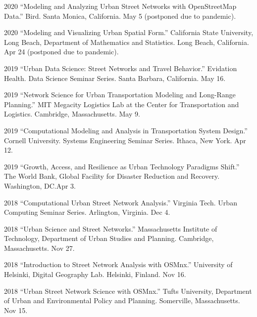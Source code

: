 \documentclass[12pt,letterpaper]{report}
\begin{document}
\begin{tablist}
        \item[2020] \tab{}\enquote{Modeling and Analyzing Urban Street Networks with OpenStreetMap Data.} Bird. Santa Monica, California. May 5 (postponed due to pandemic).

        \item[2020] \tab{}\enquote{Modeling and Visualizing Urban Spatial Form.} California State University, Long Beach, Department of Mathematics and Statistics. Long Beach, California. Apr 24 (postponed due to pandemic).

        \item[2019] \tab{}\enquote{Urban Data Science: Street Networks and Travel Behavior.} Evidation Health. Data Science Seminar Series. Santa Barbara, California. May 16.

        \item[2019] \tab{}\enquote{Network Science for Urban Transportation Modeling and Long-Range Planning.} MIT Megacity Logistics Lab at the Center for Transportation and Logistics. Cambridge, Massachusetts. May 9.

        \item[2019] \tab{}\enquote{Computational Modeling and Analysis in Transportation System Design.} Cornell University. Systems Engineering Seminar Series. Ithaca, New York. Apr 12.

        \item[2019] \tab{}\enquote{Growth, Access, and Resilience as Urban Technology Paradigms Shift.} The World Bank, Global Facility for Disaster Reduction and Recovery. Washington, DC.\@ Apr 3.

        \item[2018] \tab{}\enquote{Computational Urban Street Network Analysis.} Virginia Tech. Urban Computing Seminar Series. Arlington, Virginia. Dec 4.

        \item[2018] \tab{}\enquote{Urban Science and Street Networks.} Massachusetts Institute of Technology, Department of Urban Studies and Planning. Cambridge, Massachusetts. Nov 27.

        \item[2018] \tab{}\enquote{Introduction to Street Network Analysis with OSMnx.} University of Helsinki, Digital Geography Lab. Helsinki, Finland. Nov 16.

        \item[2018] \tab{}\enquote{Urban Street Network Science with OSMnx.} Tufts University, Department of Urban and Environmental Policy and Planning. Somerville, Massachusetts. Nov 15.


\end{tablist}
\end{document}
